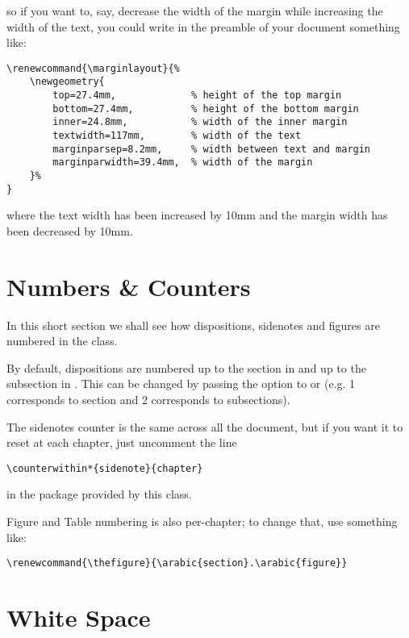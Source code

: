 so if you want to, say, decrease the width of the margin while 
increasing the width of the text, you could write in the preamble of 
your document something like:

\begin{lstlisting}
\renewcommand{\marginlayout}{%
	\newgeometry{
		top=27.4mm,				% height of the top margin
		bottom=27.4mm,			% height of the bottom margin
		inner=24.8mm,			% width of the inner margin
		textwidth=117mm,		% width of the text
		marginparsep=8.2mm,		% width between text and margin
		marginparwidth=39.4mm,	% width of the margin
	}%
}
\end{lstlisting}

where the text width has been increased by 10mm and the margin width has 
been decreased by 10mm.

\section{Numbers \& Counters}

In this short section we shall see how dispositions, sidenotes and 
figures are numbered in the  class.

By default, dispositions are numbered up to the section in 
and up to the subsection in . This can be changed by
passing the option  to or
 (e.g. 1 corresponds to section and 2 corresponds to
subsections).

The sidenotes counter is the same across all the document, but if you 
want it to reset at each chapter, just uncomment the line

\begin{lstlisting}[style=kaolstplain]
\counterwithin*{sidenote}{chapter}
\end{lstlisting}

in the  package provided by this class.

Figure and Table numbering is also per-chapter; to change that, use 
something like:

\begin{lstlisting}[style=kaolstplain]
\renewcommand{\thefigure}{\arabic{section}.\arabic{figure}}
\end{lstlisting}

\section{White Space}

